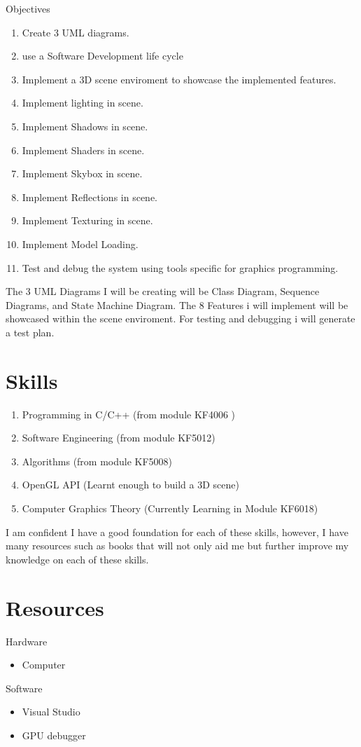 \documentclass[]{article}
\begin{document}
Objectives
\begin{enumerate}
  \item Create 3 UML diagrams.
  \item use a Software Development life cycle
  \item Implement a 3D scene enviroment to showcase the implemented features.
  \item Implement lighting in scene.
  \item Implement Shadows in scene.
  \item Implement Shaders in scene.
  \item Implement Skybox in scene.
  \item Implement Reflections in scene.
  \item Implement Texturing in scene.
  \item Implement Model Loading.
  \item Test and debug the system using tools specific for graphics programming.  
\end{enumerate}
The 3 UML Diagrams I will be creating will be Class Diagram, Sequence Diagrams, and State Machine Diagram. The 8 Features i will implement will be showcased within the scene enviroment. For testing and debugging i will generate a test plan.
\section{Skills}
\begin{enumerate}
	\item Programming in C/C++ (from module KF4006 )
	\item Software Engineering (from module KF5012)
	\item Algorithms (from module KF5008) 
	\item OpenGL API (Learnt enough to build a 3D scene) 
	\item Computer Graphics Theory (Currently Learning in Module KF6018)
\end{enumerate}
I am confident I have a good foundation for each of these skills, however, I have many resources such as books that will not only aid me but further improve my knowledge on each of these skills. 
\section{Resources}
Hardware
\begin{itemize}
  \item Computer
  
\end{itemize}
Software
\begin{itemize}
  \item Visual Studio
  \item GPU debugger
\end{itemize}
\end{document}
